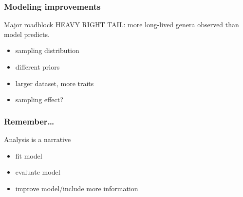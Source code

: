 \documentclass{beamer}
\begin{document}
\begin{frame}
  \frametitle{Modeling improvements}

  \begin{alertblock}{Major roadblock}
    \alert{\uppercase{heavy right tail}}: more long-lived genera observed than model predicts.
  \end{alertblock}

  \bigskip

  \begin{itemize}
    \item sampling distribution
    \item different priors
    \item larger dataset, more traits
    \item sampling effect?
  \end{itemize}
\end{frame}

\begin{frame}
  \frametitle{Remember\dots}
  Analysis is a narrative

  \bigskip

  \begin{itemize}
    \item fit model
    \item evaluate model
    \item improve model/include more information
  \end{itemize}
\end{frame}
\end{document}
